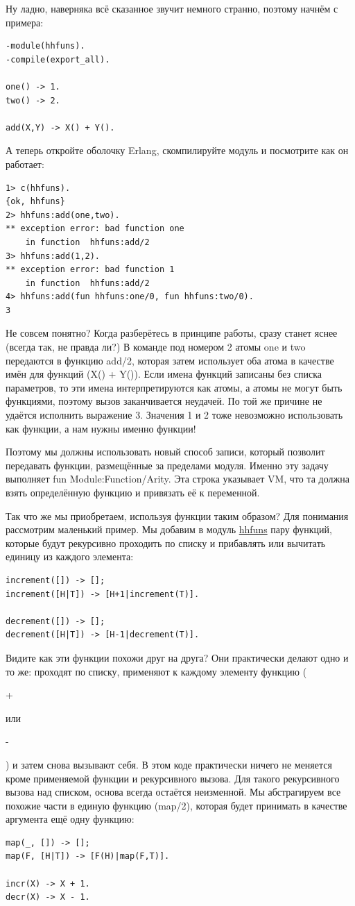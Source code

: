 \documentclass[a4paper,12pt]{report}
\newcommand{\ops}{\colorbox{lgreen}}
\begin{document}
Ну ладно, наверняка всё сказанное звучит немного странно, поэтому начнём с примера:
\begin{lstlisting}[style=erlang]
-module(hhfuns).
-compile(export_all).
 
one() -> 1.
two() -> 2.
 
add(X,Y) -> X() + Y().
\end{lstlisting}

А теперь откройте оболочку Erlang, скомпилируйте модуль и посмотрите как он работает:
\begin{lstlisting}[style=erlang]
1> c(hhfuns).
{ok, hhfuns}
2> hhfuns:add(one,two).
** exception error: bad function one
    in function  hhfuns:add/2
3> hhfuns:add(1,2).
** exception error: bad function 1
    in function  hhfuns:add/2
4> hhfuns:add(fun hhfuns:one/0, fun hhfuns:two/0).
3
\end{lstlisting}

Не совсем понятно? Когда разберётесь в принципе работы, сразу станет яснее (всегда так, не правда ли?) В команде под номером 2 атомы \ops{one} и \ops{two} передаются в функцию \ops{add/2}, которая затем использует оба атома в качестве имён для функций (\ops{X() + Y()}). Если имена функций записаны без списка параметров, то эти имена интерпретируются как атомы, а атомы не могут быть функциями, поэтому вызов заканчивается неудачей. По той же причине не удаётся исполнить выражение 3. Значения 1 и 2 тоже невозможно использовать как функции, а нам нужны именно функции!

Поэтому мы должны использовать новый способ записи, который позволит передавать функции, размещённые за пределами модуля. Именно эту задачу выполняет \ops{fun Module:Function/Arity}. Эта строка указывает VM, что та должна взять определённую функцию и привязать её к переменной.

Так что же мы приобретаем, используя функции таким образом? Для понимания рассмотрим маленький пример. Мы добавим в модуль \ops{\href{http://learnyousomeerlang.com/static/erlang/hhfuns.erl}{hhfuns}} пару функций, которые будут рекурсивно проходить по списку и прибавлять или вычитать единицу из каждого элемента:
\begin{lstlisting}[style=erlang]
increment([]) -> [];
increment([H|T]) -> [H+1|increment(T)].
 
decrement([]) -> [];
decrement([H|T]) -> [H-1|decrement(T)].
\end{lstlisting}

Видите как эти функции похожи друг на друга? Они практически делают одно и то же: проходят по списку, применяют к каждому элементу функцию (\ops{+\strut} или \ops{-\strut}) и затем снова вызывают себя. В этом коде практически ничего не меняется кроме применяемой функции и рекурсивного вызова. Для такого рекурсивного вызова над списком, основа всегда остаётся неизменной. Мы абстрагируем все похожие части в единую функцию (\ops{map/2}), которая будет принимать в качестве аргумента ещё одну функцию:
\begin{lstlisting}[style=erlang]
map(_, []) -> [];
map(F, [H|T]) -> [F(H)|map(F,T)].
 
incr(X) -> X + 1.
decr(X) -> X - 1.
\end{lstlisting}
\end{document}
